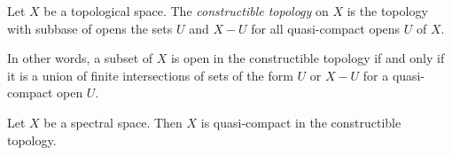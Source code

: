 \begin{definition}
    Let $X$ be a topological space. The \emph{constructible topology} on $X$
    is the topology with subbase of opens the sets $U$ and $X - U$ for
    all quasi-compact opens $U$ of $X$.
    \label{def:constructible-topology}
    \leanok
\end{definition}

In other words, a subset of $X$ is open in the constructible topology if and only if
it is a union of finite intersections of sets of the form $U$ or $X - U$ for
a quasi-compact open $U$.

\begin{lemma}[\stacksproject{0901}]
    Let $X$ be a spectral space. Then $X$ is quasi-compact in the constructible topology.
    \label{lemma:spectral-constructible-quasi-compact}
    \leanok
\end{lemma}

